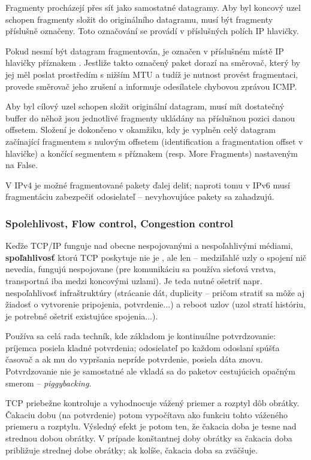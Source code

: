 Fragmenty procházejí přes síť jako samostatné datagramy. Aby byl koncový uzel schopen fragmenty složit do originálního datagramu, musí být fragmenty příslušně označeny. Toto označování se provádí v příslušných polích IP hlavičky.

Pokud nesmí být datagram fragmentován, je označen v příslušném místě IP hlavičky příznakem . Jestliže takto označený paket dorazí na směrovač, který by jej měl poslat prostředím s nižším MTU a tudíž je nutnost provést fragmentaci, provede směrovač jeho zrušení a informuje odesílatele chybovou zprávou ICMP. 

Aby byl cílový uzel schopen složit originální datagram, musí mít dostatečný buffer do něhož jsou jednotlivé fragmenty ukládány na příslušnou pozici danou offsetem. Složení je dokončeno v okamžiku, kdy je vyplněn celý datagram začínající fragmentem s nulovým offsetem (identification a fragmentation offset v hlavičke) a končící segmentem s příznakem  (resp. More Fragments) nastaveným na False.

V IPv4 je možné fragmentované pakety ďalej deliť; naproti tomu v IPv6 musí fragmentáciu zabezpečiť odosielateľ -- nevyhovujúce pakety sa zahadzujú.


\subsubsection*{Spolehlivost, Flow control, Congestion control}
Keďže TCP/IP funguje nad obecne nespojovanými a nespoľahlivými médiami, \textbf{spoľahlivosť} ktorú TCP poskytuje nie je , ale len  -- medziľahlé uzly o spojení nič nevedia, fungujú nespojovane (pre komunikáciu sa používa sieťová vrstva, transportná  iba medzi koncovými uzlami). Je teda nutné ošetriť napr. nespoľahlivosť infraštruktúry (strácanie dát, duplicity -- pričom stratiť sa môže aj žiadosť o vytvorenie pripojenia, potvrdenie...) a reboot uzlov (uzol stratí históriu, je potrebné ošetriť existujúce spojenia...).

Používa sa celá rada techník, kde základom je kontinuálne potvrdzovanie: príjemca posiela kladné potvrdenia; odosielateľ po každom odoslaní spúšťa časovač a ak mu do vypršania nepríde potvrdenie, posiela dáta znovu.  Potvrdzovanie nie je samostatné ale vkladá sa do paketov cestujúcich opačným smerom -- \emph{piggybacking}.

TCP priebežne kontroluje  a vyhodnocuje vážený priemer a rozptyl dôb obrátky. Čakaciu dobu (na potvrdenie) potom vypočítava ako funkciu tohto váženého priemeru a rozptylu. Výsledný efekt je potom ten, že čakacia doba je tesne nad strednou dobou obrátky. V prípade konštantnej doby obrátky sa čakacia doba približuje strednej dobe obrátky; ak kolíše, čakacia doba sa zväčšuje.

